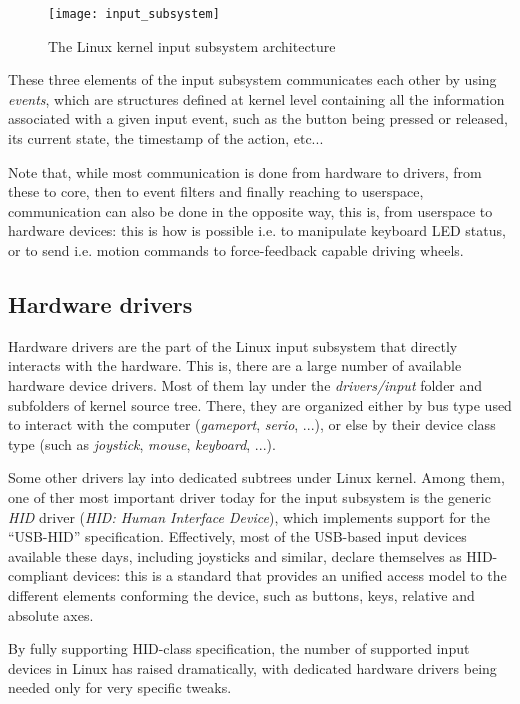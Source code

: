 \begin{figure}[htb]
\centering
\texttt{[image: input\_subsystem]}
\caption{The Linux kernel input subsystem architecture}
\label{fig:input_subsystem}
\end{figure}

These three elements of the input subsystem communicates each other by using \emph{events}, which are structures defined at kernel level containing all the information associated with a given input event, such as the button being pressed or released, its current state, the timestamp of the action, etc...

Note that, while most communication is done from hardware to drivers, from these to core, then to event filters and finally reaching to userspace, communication can also be done in the opposite way, this is, from userspace to hardware devices: this is how is possible i.e. to manipulate keyboard LED status, or to send i.e. motion commands to force-feedback capable driving wheels.

\subsection{Hardware drivers}
Hardware drivers are the part of the Linux input subsystem that directly interacts with the hardware. This is, there are a large number of available hardware device drivers. Most of them lay under the \emph{drivers/input} folder and subfolders of kernel source tree. There, they are organized either by bus type used to interact with the computer (\emph{gameport}, \emph{serio}, ...), or else by their device class type (such as \emph{joystick}, \emph{mouse}, \emph{keyboard}, ...).

Some other drivers lay into dedicated subtrees under Linux kernel. Among them, one of ther most important driver today for the input subsystem is the generic \emph{HID} driver (\emph{HID: Human Interface Device}), which implements support for the ``USB-HID'' specification. Effectively, most of the USB-based input devices available these days, including joysticks and similar, declare themselves as HID-compliant devices: this is a standard that provides an unified access model to the different elements conforming the device, such as buttons, keys, relative and absolute axes. 

By fully supporting HID-class specification, the number of supported input devices in Linux has raised dramatically, with dedicated hardware drivers being needed only for very specific tweaks.

